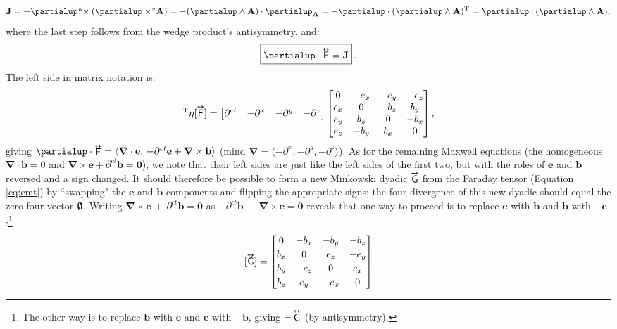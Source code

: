 \documentclass[12pt]{article}
\renewcommand{\vv}[1]{\mathbf{#1}}
\newcommand{\del}{\boldsymbol{\nabla}}
\newcommand{\tightoverset}[2]{%
  \mathop{#2}\limits^{\vbox to -.5ex{\kern-0.75ex\hbox{$#1$}\vss}}}
\newcommand{\inlinedy}[1]{\tightoverset{\text{\tiny$\bm\leftrightarrow$}}{#1}}
\newcommand{\fnoverset}[2]{%
  \mathop{#2}\limits^{\vbox to -.5ex{\kern-0.85ex\hbox{$#1$}\vss}}}
\newcommand{\footnotedy}[1]{\fnoverset{\text{\tiny$\bm\leftrightarrow$}}{#1}}
\newcommand{\capdy}[1]{ \overset{ \text{\tiny$\bm\leftrightarrow$} }{\vphantom{\text{\small{A}}}\smash{#1}} }
\begin{document}
\begin{equation*}
\vv J = - \partialup \mkern1mu `` \mkern-4mu \times ( \partialup \times \mkern-4mu " \mkern1mu \vv A ) = - ( \partialup \wedge \vv A ) \cdot \partialup_{\vv A} = - \partialup \cdot ( \partialup \wedge \vv A )^\mathrm{T} = \partialup \cdot (\partialup \wedge \vv A),
\end{equation*}
where the last step follows from the wedge product's antisymmetry, and:
\begin{equation}\label{eq:ime}
\boxed{ \vphantom{A_{A_A}} \partialup \cdot \capdy{\mathsf{F}} = \vv J } \, .
\end{equation}
The left side in matrix notation is:
\begin{equation*}
[\partialup]^{\mathrm{T}} \eta [\capdy{\mathsf{F}}]
=
\begin{bmatrix}
\partial^{ct} & - \partial^x & - \partial^y & - \partial^z
\end{bmatrix}
\begin{bmatrix}
0 & -e_x & -e_y & -e_z \\
e_x & 0 & -b_z & b_y \\
e_y & b_z & 0 & -b_x \\
e_z & -b_y & b_x & 0
\end{bmatrix} ,
\end{equation*}
giving $\partialup \cdot \inlinedy{\mathsf{F}} = \langle \del \cdot \vv e , \, - \partial^{ct} \vv e + \del \times \vv b \rangle$ (mind $\del = \langle - \partial^x , - \partial^y , - \partial^z \rangle$). As for the remaining Maxwell equations (the homogeneous $\del \cdot \vv b = 0$ and ${ \del \times \vv e + \partial^{ct} \vv b = \vv 0 }$), we note that their left sides are just like the left sides of the first two, but with the roles of $\vv e$ and $\vv b$ reversed and a sign changed. It should therefore be possible to form a new Minkowski dyadic $\inlinedy{\mathsf{G}}$ from the Faraday tensor (Equation \ref{eq:emt}) by ``swapping" the $\vv e$ and $\vv b$ components and flipping the appropriate signs; the four-divergence of this new dyadic should equal the zero four-vector $\textrm{\mbox{\boldmath $\emptyset$}}$. Writing $\del \times \vv e \, + \, \partial^{ct} \vv b = \vv 0$ as $- \partial^{ct} \vv b \, - \, \del \times \vv e = \vv 0$ reveals that one way to proceed is to replace $\vv e$ with $\vv b$ and $\vv b$ with $- \vv e$:\footnote{The other way is to replace $\vv b$ with $\vv e$ and $\vv e$ with $- \vv b$, giving $-\footnotedy{\mathsf{G}}$ (by antisymmetry).}
\begin{equation}\label{eq:mt}
[ \capdy{\mathsf{G}} ]
=
\begin{bmatrix}
0 & -b_x & -b_y & -b_z \\[.5ex]
b_x & 0 & e_z & -e_y \\[.5ex]
b_y & -e_z & 0 & e_x \\[.5ex]
b_z & e_y & -e_x & 0
\end{bmatrix}
\end{equation}
\end{document}

